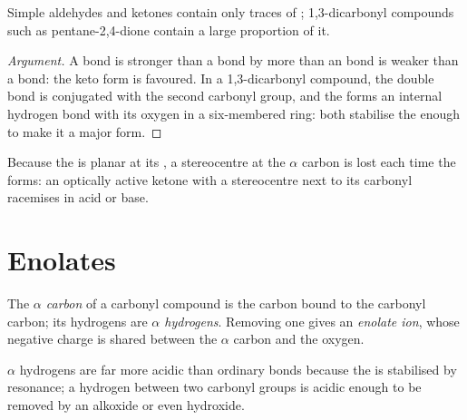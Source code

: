 \begin{proposition}\label{prop:b2:enolates-aldol:enol-content}
Simple aldehydes and ketones contain only traces of ; 1,3-dicarbonyl compounds such as
pentane-2,4-dione contain a large proportion of it.
\end{proposition}

\begin{proof}[Argument]
A  bond is stronger than a  bond by more than an  bond is weaker than a 
bond: the keto form is favoured. In a 1,3-dicarbonyl compound, the  double bond is conjugated
with the second carbonyl group, and the   forms an internal hydrogen bond with its oxygen
in a six-membered ring: both stabilise the  enough to make it a major form.
\end{proof}

Because the  is planar at its , a stereocentre at the $\alpha$ carbon is lost each time
the  forms: an optically active ketone with a stereocentre next to its carbonyl racemises in acid
or base.

\section{Enolates}

\begin{definition}[Enolates]\label{def:b2:enolates-aldol:enolate}
The \emph{$\alpha$ carbon} of a carbonyl compound is the carbon
bound to the carbonyl carbon; its hydrogens are \emph{$\alpha$ hydrogens}.
Removing one gives an \emph{enolate ion}, whose
negative charge is shared between the $\alpha$ carbon and the oxygen.
\end{definition}

\begin{proposition}\label{prop:b2:enolates-aldol:alpha-acidity}
$\alpha$ hydrogens are far more acidic than ordinary  bonds because the  is stabilised
by resonance; a hydrogen between two carbonyl groups is acidic enough to be removed by an alkoxide or
even hydroxide.
\end{proposition}


